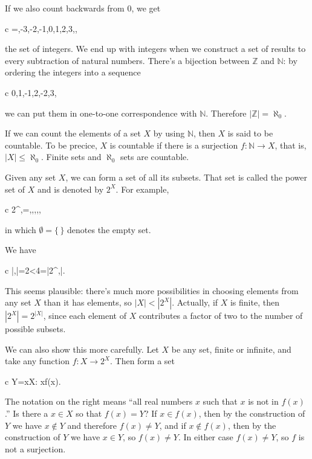 \documentclass[11pt,%
]{memoir}
\newenvironment{eqna}{\begin{IEEEeqnarray}{c}}{\end{IEEEeqnarray}\ignorespacesafterend}
\newcommand{\NN}{\mathbb{N}}
\newcommand{\ZZ}{\mathbb{Z}}
\begin{document}
If we also count backwards from \(0\), we get
\begin{eqna}
    \ZZ=\lbrace\dotsc,-3,-2,-1,0,1,2,3,\dotsc\rbrace,
\end{eqna}
the set of integers. We end up with integers when we construct a set of results to every subtraction of natural numbers. There's a bijection between \(\ZZ\) and \(\NN\): by ordering the integers into a sequence
\begin{eqna}
    0,1,-1,2,-2,3,\dotsc
\end{eqna}
we can put them in one-to-one correspondence with \(\NN\). Therefore  \(|\ZZ|=\aleph_0\).

If we can count the elements of a set \(X\) by using \(\NN\), then \(X\) is said to be countable. To be precice, \(X\) is countable if there is a surjection \(f:\NN\rightarrow X\), that is, \(|X|\leq\aleph_0\). Finite sets and \(\aleph_0\) sets are countable.

Given any set \(X\), we can form a set of all its subsets. That set is called the power set of \(X\) and is denoted by \(2^X\). For example,
\begin{eqna}
    2^{\lbrace\uparrow,\downarrow\rbrace}=\lbrace\emptyset,\lbrace\uparrow\rbrace,\lbrace\downarrow\rbrace,\lbrace\uparrow,\downarrow\rbrace\rbrace,
\end{eqna}
in which \(\emptyset=\lbrace\,\rbrace\) denotes the empty set.

We have
\begin{eqna}
    |\lbrace\uparrow,\downarrow\rbrace|=2<4=|2^{\lbrace\uparrow,\downarrow\rbrace}|.
\end{eqna}
This seems plausible: there's much more possibilities in choosing elements from any set \(X\) than it has elements, so \(|X|<|2^X|\). Actually, if \(X\) is finite, then \(|2^X|=2^{|X|}\), since each element of \(X\) contributes a factor of two to the number of possible subsets.

We can also show this more carefully. Let \(X\) be any set, finite or infinite, and take any function \(f:X\rightarrow 2^X\). Then form a set
\begin{eqna}
    Y=\lbrace x\in X: x\notin f(x)\rbrace.
\end{eqna}
The notation on the right means ``all real numbers \(x\) such that \(x\) is not in \(f(x)\).'' Is there a \(x\in X\) so that \(f(x)=Y\)? If \(x\in f(x)\), then by the construction of \(Y\) we have \(x\notin Y\) and therefore \(f(x)\neq Y\), and if \(x\notin f(x)\), then by the construction of \(Y\) we have \(x\in Y\), so \(f(x)\neq Y\). In either case \(f(x)\neq Y\), so \(f\) is not a surjection.
\end{document}

